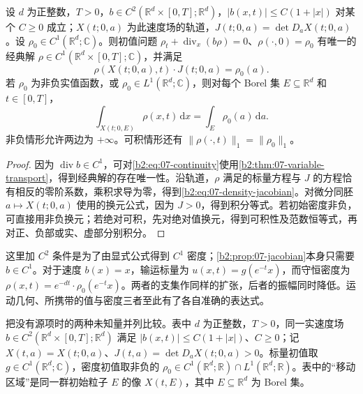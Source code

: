 \begin{theorem}\label{b2:thm:07-mass-transport}
设 \(d\) 为正整数，\(T>0\)，\(b\in C^2(\mathbb R^d\times[0,T];\mathbb R^d)\)，\(|b(x,t)|\leq C(1+|x|)\) 对某个 \(C\geq0\) 成立；\(X(t;0,a)\) 为此速度场的轨道，\(J(t;0,a)=\det D_aX(t;0,a)\)。设 \(\rho_0\in C^1(\mathbb R^d;\mathbb C)\)。则初值问题 \(\rho_t+\operatorname{div}_x(b\rho)=0\)、\(\rho(\cdot,0)=\rho_0\) 有唯一的经典解 \(\rho\in C^1(\mathbb R^d\times[0,T];\mathbb C)\)，并满足
\begin{equation}\label{b2:eq:07-density-jacobian}
 \rho(X(t;0,a),t)\cdot J(t;0,a)=\rho_0(a).
\end{equation}
若 \(\rho_0\) 为非负实值函数，或 \(\rho_0\in L^1(\mathbb R^d;\mathbb C)\)，则对每个 Borel 集 \(E\subseteq\mathbb R^d\) 和 \(t\in[0,T]\)，
\[
 \int_{X(t;0,E)}\rho(x,t)\,\mathrm dx=\int_E\rho_0(a)\,\mathrm da.
\]
非负情形允许两边为 \(+\infty\)。可积情形还有 \(\|\rho(\cdot,t)\|_1=\|\rho_0\|_1\)。
\end{theorem}
\begin{proof}
因为 \(\operatorname{div}b\in C^1\)，可对\eqref{b2:eq:07-continuity}使用\cref{b2:thm:07-variable-transport}，得到经典解的存在唯一性。沿轨道，\(\rho\) 满足的标量方程与 \(J\) 的方程恰有相反的零阶系数，乘积求导为零，得到\eqref{b2:eq:07-density-jacobian}。对微分同胚 \(a\mapsto X(t;0,a)\) 使用的换元公式，因为 \(J>0\)，得到积分等式。若初始密度非负，可直接用非负换元；若绝对可积，先对绝对值换元，得到可积性及范数恒等式，再对正、负部或实、虚部分别积分。
\end{proof}

这里加 \(C^2\) 条件是为了由显式公式得到 \(C^1\) 密度；\cref{b2:prop:07-jacobian}本身只需要 \(b\in C^1\)。对于速度 \(b(x)=x\)，输运标量为 \(u(x,t)=g(e^{-t}x)\)，而守恒密度为 \(\rho(x,t)=e^{-dt}\cdot\rho_0(e^{-t}x)\)。两者的支集作同样的扩张，后者的振幅同时降低。运动几何、所携带的值与密度三者至此有了各自准确的表达式。

\ProseParagraphBreak

把没有源项时的两种未知量并列比较。表中 \(d\) 为正整数，\(T>0\)，同一实速度场 \(b\in C^2(\mathbb R^d\times[0,T];\mathbb R^d)\) 满足 \(|b(x,t)|\leq C(1+|x|)\)、\(C\geq0\)；记 \(X(t,a)=X(t;0,a)\)、\(J(t,a)=\det D_aX(t;0,a)>0\)。标量初值取 \(g\in C^1(\mathbb R^d;\mathbb C)\)，密度初值取非负的 \(\rho_0\in C^1(\mathbb R^d;\mathbb R)\cap L^1(\mathbb R^d;\mathbb R)\)。表中的“移动区域”是同一群初始粒子 \(E\) 的像 \(X(t,E)\)，其中 \(E\subseteq\mathbb R^d\) 为 Borel 集。

